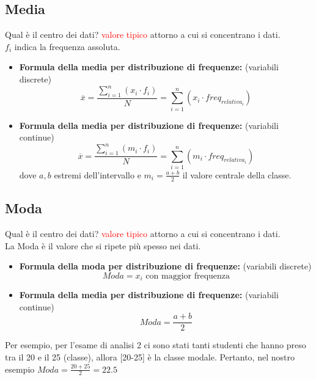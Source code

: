 \documentclass{article}  %
\theoremstyle{definition}
\begin{document}
\subsection{Media}
Qual è il centro dei dati? \textcolor{red}{valore tipico} attorno a cui si concentrano i dati. \\
$f_i$ indica la frequenza assoluta.
\begin{itemize}
	\item \textbf{Formula della media per distribuzione di frequenze:} (variabili discrete)
	      \[
		      \overline{x}=  \frac{\sum_{i=1}^{n} (x_i \cdot f_i)}{N} = \sum_{i=1}^{n} (x_i \cdot freq_{relativa_i})
	      \]
	\item \textbf{Formula della media per distribuzione di frequenze:} (variabili continue)
	      \[
		      \overline{x}=  \frac{\sum_{i=1}^{n} (m_i \cdot f_i)}{N} = \sum_{i=1}^{n} (m_i \cdot freq_{relativa_i})
	      \]
	      dove $a,b$ estremi dell'intervallo e $m_i= \frac{a+b}{2}$ il valore centrale della classe.
\end{itemize}
\subsection{Moda}
Qual è il centro dei dati? \textcolor{red}{valore tipico} attorno a cui si concentrano i dati. \\
La Moda è il valore che si ripete più spesso nei dati.
\begin{itemize}
	\item \textbf{Formula della moda per distribuzione di frequenze:} (variabili discrete)
	      \[
		      Moda =  x_i \text{ con maggior frequenza}
	      \]
	\item \textbf{Formula della media per distribuzione di frequenze:} (variabili continue)
	      \[
		      Moda = \frac{a+b}{2}
	      \]
\end{itemize}
\begin{esempio}
	Per esempio, per l'esame di analisi 2 ci sono stati tanti studenti che hanno preso tra il 20 e il 25 (classe), allora
		[20-25] è la classe modale.
	Pertanto, nel nostro esempio $Moda =  \frac{20+25}{2}=22.5$
\end{esempio}
\end{document}
